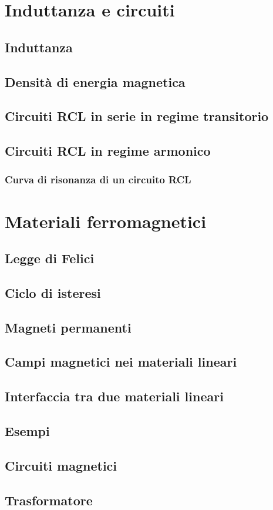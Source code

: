 \documentclass{book}
\begin{document}
\chapter{Induttanza e circuiti}
\section{Induttanza}
\section{Densit\`a di energia magnetica}
\section{Circuiti RCL in serie in regime transitorio}
\section{Circuiti RCL in regime armonico}
\subsection{Curva di risonanza di un circuito RCL}

\chapter{Materiali ferromagnetici}
\section{Legge di Felici}
\section{Ciclo di isteresi}
\section{Magneti permanenti}
\section{Campi magnetici nei materiali lineari}
\section{Interfaccia tra due materiali lineari}
\section{Esempi}
\section{Circuiti magnetici}
\section{Trasformatore}
\end{document}
